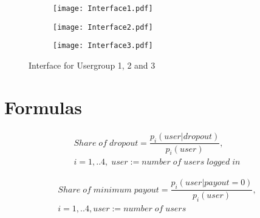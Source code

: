 \setcounter{figure}{0}
\begin{figure}[htbp] %
\begin{center} 
\begin{subfigure} 
\centering
\texttt{[image: Interface1.pdf]}
\end{subfigure} 
\begin{subfigure} 
\centering
\texttt{[image: Interface2.pdf]}
\end{subfigure}
\begin{subfigure} 
\centering
\texttt{[image: Interface3.pdf]}
\end{subfigure}
  \caption{Interface for Usergroup 1, 2  and 3}
    \label{InterfaceOverview} 
\end{center}
\end{figure}

\newpage

\section{Formulas}
		\label{Appendix-Formulas}

\begin{equation}
\begin{split}
Share\;of\;dropout = \dfrac{p_i(user|dropout)}{p_i(user)}, \quad \quad \\ 
i = 1,..4,\;user := number\;of\;users\;logged\;in
\end{split}
\end{equation}

\begin{equation}
\begin{split}
Share\;of\;minimum\;payout = \dfrac{p_i(user|payout=0)}{p_i(user)}, \\ 
i = 1,..4, user := number\;of\;users \quad \quad
\end{split}
\end{equation}

